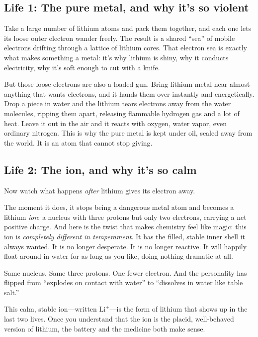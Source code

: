 \documentclass[11pt, letterpaper]{article}
\newcommand{\Lip}{\text{Li}^{+}}
\begin{document}
\subsection{Life 1: The pure metal, and why it's so violent}

Take a large number of lithium atoms and pack them together, and each one lets its loose outer electron wander freely. The result is a shared ``sea'' of mobile electrons drifting through a lattice of lithium cores. That electron sea is exactly what makes something a metal: it's why lithium is shiny, why it conducts electricity, why it's soft enough to cut with a knife.

But those loose electrons are also a loaded gun. Bring lithium metal near almost anything that wants electrons, and it hands them over instantly and energetically. Drop a piece in water and the lithium tears electrons away from the water molecules, ripping them apart, releasing flammable hydrogen gas and a lot of heat. Leave it out in the air and it reacts with oxygen, water vapor, even ordinary nitrogen. This is why the pure metal is kept under oil, sealed away from the world. It is an atom that cannot stop giving.

\subsection{Life 2: The ion, and why it's so calm}

Now watch what happens \textit{after} lithium gives its electron away.

The moment it does, it stops being a dangerous metal atom and becomes a lithium \textit{ion}: a nucleus with three protons but only two electrons, carrying a net positive charge. And here is the twist that makes chemistry feel like magic: this ion is \textit{completely different in temperament}. It has the filled, stable inner shell it always wanted. It is no longer desperate. It is no longer reactive. It will happily float around in water for as long as you like, doing nothing dramatic at all.

Same nucleus. Same three protons. One fewer electron. And the personality has flipped from ``explodes on contact with water'' to ``dissolves in water like table salt.''

This calm, stable ion---written $\Lip$---is the form of lithium that shows up in the last two lives. Once you understand that the ion is the placid, well-behaved version of lithium, the battery and the medicine both make sense.
\end{document}
